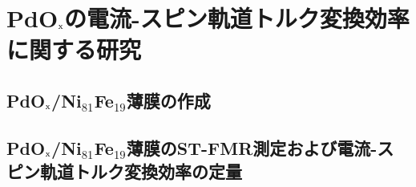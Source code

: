 
\chapter{PdO$_{\rm x}$の電流-スピン軌道トルク変換効率に関する研究}

\section{PdO$_{\rm x}$/Ni$_{81}$Fe$_{19}$薄膜の作成}

\section{PdO$_{\rm x}$/Ni$_{81}$Fe$_{19}$薄膜のST-FMR測定および電流-スピン軌道トルク変換効率の定量}